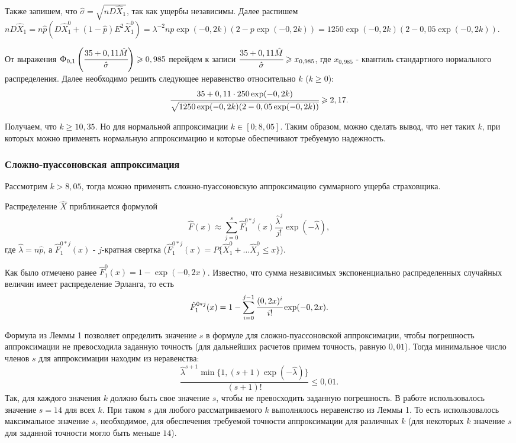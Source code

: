 \documentclass[a4paper,12pt]{article}
\begin{document}
Также запишем, что $\hat{\sigma} = \sqrt{n D\hat{X}_1}$, так как ущербы независимы.  Далее распишем $n D\hat{X}_1 = n\hat{p} (D\hat{X}_1^0 + (1-\hat{p})E^2\hat{X}_1^0) = \lambda^{-2}np\exp(-0,2k)(2 - p\exp(-0,2k)) = 1250 \exp(-0,2k)(2 - 0,05\exp(-0,2k))$. 

От выражения $\Upphi_{0, 1}\left(\cfrac{35 +0,11\hat{M}}{\hat{\sigma}}\right) \ge 0,985$ перейдем к записи $\cfrac{35 +0,11\hat{M}}{\hat{\sigma}} \ge x_{0,985}$, где $x_{0,985}$ - квантиль стандартного нормального распределения. Далее необходимо решить следующее неравенство относительно $k$ ($k \ge 0$):
\[\cfrac{35 + 0,11 \cdot 250 \exp(-0,2 k)}{\sqrt{1250 \exp(-0,2k)(2 - 0,05\exp(-0,2k))}} \ge 2,17.\]

Получаем, что $k \ge 10,35$. Но для нормальной аппроксимации $k \in [0; 8,05]$. Таким образом, можно сделать вывод, что нет таких $k$, при которых можно применять нормальную аппроксимацию и которые обеспечивают требуемую надежность.

\subsubsection{Сложно-пуассоновская аппроксимация}
Рассмотрим $k > 8,05$, тогда можно применять сложно-пуассоновскую аппроксимацию суммарного ущерба страховщика. 

Распределение $\hat{X}$ приближается формулой 
\[\hat{F}(x) \approx \sum_{j = 0}^{s} \hat{F}_1^{0 * j}(x) \frac{\hat{\lambda}^j}{j!}\exp (-\hat{\lambda}),\]
где $\hat{\lambda} = n\hat{p}$, а $\hat{F}_1^{0 * j}(x)$ - $j$-кратная свертка ($\hat{F}_1^{0 * j}(x) = P\{\hat{X}_1^0 + \dots \hat{X}_j^0 \le x\}$).

Как было отмечено ранее $\hat{F}_1^0(x) = 1 - \exp(-0,2 x)$. Известно, что сумма независимых экспоненциально распределенных случайных величин имеет распределение Эрланга, то есть
\[\hat{F}_1^{0 * j}(x) = 1 - \sum_{i = 0}^{j - 1} \cfrac{(0,2 x)^i}{i!} \exp(-0,2x).\]

Формула из Леммы 1 позволяет определить значение $s$ в формуле для сложно-пуассоновской аппроксимации, чтобы погрешность аппроксимации не превосходила заданную точность (для дальнейших расчетов примем точность, равную $0,01$). Тогда минимальное число членов $s$ для аппроксимации находим из неравенства:
\[\frac{\hat{\lambda}^{s + 1} \min\{1, (s + 1)\exp(-\hat{\lambda})\}}{(s + 1)!} \le 0,01.\]
Так, для каждого значения $k$ должно быть свое значение $s$, чтобы не превосходить заданную погрешность. В работе использовалось значение $s = 14$ для всех $k$. При таком $s$ для любого рассматриваемого $k$ выполнялось неравенство из Леммы 1. То есть использовалось максимальное значение $s$, необходимое, для обеспечения требуемой точности аппроксимации для различных $k$ (для некоторых $k$ значение $s$ для заданной точности могло быть меньше $14$).
\end{document}
